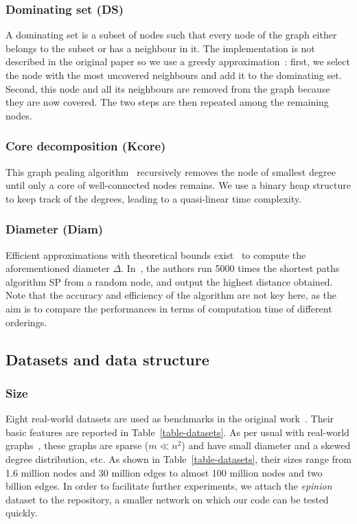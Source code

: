 \subsubsection{Dominating set (DS)}
A dominating set is a subset of nodes such that every node of the graph either belongs to the subset or has a neighbour in it. The implementation is not described in the original paper so we use a greedy approximation~\cite{cormen}: first, we select the node with the most uncovered neighbours and add it to the dominating set. Second, this node and all its neighbours are removed from the graph because they are now covered. The two steps are then repeated among the remaining nodes.

\subsubsection{Core decomposition (Kcore)}
This graph pealing algorithm~\cite{kcore} recursively removes the node of smallest degree until only a core of well-connected nodes remains. We use a binary heap structure to keep track of the degrees, leading to a quasi-linear time complexity.

\subsubsection{Diameter (Diam)}
Efficient approximations with theoretical bounds exist~\cite{BFSdiameter} to compute the aforementioned diameter $\Delta$. In~\cite{gorder}, the authors run 5000 times the shortest paths algorithm SP from a random node, and output the highest distance obtained. 
%
Note that the accuracy and efficiency of the algorithm are not key here, as the aim is to compare the performances in terms of computation time of different orderings.





\subsection{Datasets and data structure} \label{datasets}


\subsubsection{Size}
Eight real-world datasets are used as benchmarks in the original work~\cite{gorder}. Their basic features are reported in Table~\ref{table-datasets}.
%
As per usual with real-world graphs~\cite{networkProperties}, these graphs are sparse ($m \ll n^2$) and have small diameter and a skewed degree distribution, etc.
%
As shown in Table~\ref{table-datasets}, their sizes range from 1.6 million nodes and 30 million edges to almost 100 million nodes and two billion edges.
%
In order to facilitate further experiments, we attach the \textit{epinion} dataset to the repository, a smaller network on which our code can be tested quickly.



